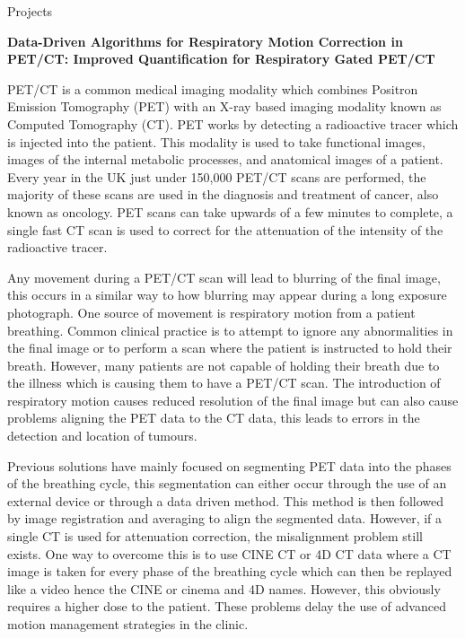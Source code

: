 \documentclass{cv}
\begin{document}
\begin{rSection}{Projects}

{\bf Data-Driven Algorithms for Respiratory Motion Correction in PET/CT: Improved Quantification for Respiratory Gated PET/CT} \hfill {\em} 

\item PET/CT is a common medical imaging modality which combines Positron Emission Tomography (PET) with an X-ray based imaging modality known as Computed Tomography (CT). PET works by detecting a radioactive tracer which is injected into the patient. This modality is used to take functional images, images of the internal metabolic processes, and anatomical images of a patient. Every year in the UK just under 150,000 PET/CT scans are performed, the majority of these scans are used in the diagnosis and treatment of cancer, also known as oncology. PET scans can take upwards of a few minutes to complete, a single fast CT scan is used to correct for the attenuation of the intensity of the radioactive tracer.

\item Any movement during a PET/CT scan will lead to blurring of the final image, this occurs in a similar way to how blurring may appear during a long exposure photograph. One source of movement is respiratory motion from a patient breathing. Common clinical practice is to attempt to ignore any abnormalities in the final image or to perform a scan where the patient is instructed to hold their breath. However, many patients are not capable of holding their breath due to the illness which is causing them to have a PET/CT scan. The introduction of respiratory motion causes reduced resolution of the final image but can also cause problems aligning the PET data to the CT data, this leads to errors in the detection and location of tumours.

\item Previous solutions have mainly focused on segmenting PET data into the phases of the breathing cycle, this segmentation can either occur through the use of an external device or through a data driven method. This method is then followed by image registration and averaging to align the segmented data. However, if a single CT is used for attenuation correction, the misalignment problem still exists. One way to overcome this is to use CINE CT or 4D CT data where a CT image is taken for every phase of the breathing cycle which can then be replayed like a video hence the CINE or cinema and 4D names. However, this obviously requires a higher dose to the patient. These problems delay the use of advanced motion management strategies in the clinic.


\end{rSection}
\end{document}
